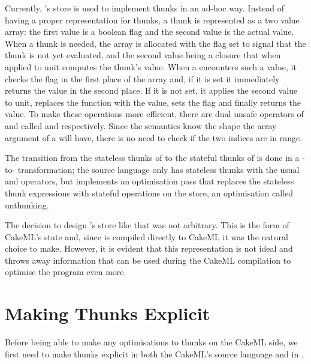 Currently, \StateLang{}'s store is used to implement thunks in an ad-hoc way.
Instead of having a proper representation for thunks, a thunk is represented as
a two value array: the first value is a boolean flag and the second value is the
actual value. When a thunk is needed, the array is allocated with the flag set
to signal that the thunk is not yet evaluated, and the second value being a
closure that when applied to unit computes the thunk's value. When a 
encounters such a value, it checks the flag in the first place of the array and,
if it is set it immediately returns the value in the second place. If it is not
set, it applies the second value to unit, replaces the function with the value,
sets the flag and finally returns the value. To make these operations more
efficient, there are dual unsafe operators of  and  called
 and  respectively. Since the semantics know
the shape the array argument of a  will have, there is no need to
check if the two indices are in range.

The transition from the stateless thunks of \ThunkLang{} to the stateful thunks
of \StateLang{} is done in a \StateLang{}-to-\StateLang{} transformation; the
\StateLang{} source language only has stateless thunks with the usual
 and  operators, but implements an optimisation pass that
replaces the stateless thunk expressions with stateful operations on the store,
an optimisation called unthunking.

The decision to design \StateLang{}'s store like that was not arbitrary. This is
the form of CakeML's state and, since \StateLang{} is compiled directly to
CakeML it was the natural choice to make. However, it is evident that this
representation is not ideal and throws away information that can be used during
the CakeML compilation to optimise the program even more.

\section{Making Thunks Explicit}

Before being able to make any optimisations to thunks on the CakeML side, we
first need to make thunks explicit in both the CakeML's source language and in
\StateLang{}.

